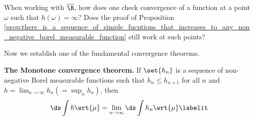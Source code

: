 \documentclass{article} %
\begin{document}
\begin{question}
When working with $\overline{\R}$, how does one check convergence of a function at a point $\omega$ such that $h(\omega)=\infty$?  Does the proof of Proposition \ref{prop:there_is_a_sequence_of_simple_fucntions_that_increases_to_any_non_negative_borel_measurable_function} still work at such points?
\end{question}

Now we establish one of the fundamental convergence theorems. 

\begin{theorem}{\textbf{The Monotone convergence theorem.}}
If $\set{h_n}$ is a sequence of non-negative Borel measurable functions such that $h_n \leq h_{n+1}$ for all $n$ and $h =\lim_{n \to \infty} h_n (= \sup_n h_n)$, then 
\begin{align*}
\ds \int h \wrt{\mu} = \lim_{n \to \infty} \ds\int h_n \wrt{\mu}
\labelit \label{eqn:monotone_convergence_theorem_conclusion}	
\end{align*}
\label{thm:monotone_convergence_theorem}
\end{theorem}
\end{document}
